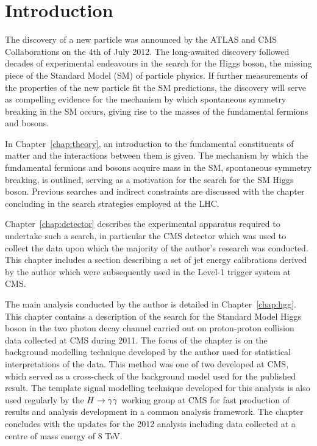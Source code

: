 \chapter{Introduction}
\label{chap:introduction}

The discovery of a new particle was announced by the ATLAS and CMS
Collaborations on the 4th of July 2012. The long-awaited discovery 
followed decades of experimental endeavours in the search for the
Higgs boson, the missing piece of the Standard Model (SM) of particle physics.
If further measurements of the properties of the new particle fit the SM predictions, 
the discovery will serve as compelling evidence for the mechanism by which
spontaneous symmetry breaking in the SM occurs, giving rise
to the masses of the fundamental fermions and bosons. 

In Chapter~\ref{chap:theory}, an introduction to the fundamental constituents of
matter and the interactions between them is given. The mechanism by which 
the fundamental fermions and bosons acquire mass in the SM, spontaneous symmetry breaking,
is outlined, serving as a motivation for the search for the SM Higgs boson. 
Previous searches and indirect constraints are discussed with the chapter concluding in
the search strategies employed at the LHC.

Chapter~\ref{chap:detector} describes the experimental apparatus required to undertake 
such a search, in particular the CMS detector which was used to collect the data upon which 
the majority of the author's research was conducted. This chapter includes a section describing 
a set of jet energy calibrations derived by the author which were subsequently used  
in the Level-1 trigger system at CMS.

The main analysis conducted by the author is detailed in Chapter~\ref{chap:hgg}. This chapter 
contains a description of the search for the Standard Model Higgs boson in the two
photon decay channel carried out on proton-proton collision data collected at CMS during 2011.
The focus of the chapter is on the background modelling technique developed by the author
used for statistical interpretations of the data. This method was one of two developed at CMS, 
which served as a cross-check of the background model used for the published result. 
The template signal modelling technique developed for this analysis is also used regularly by the $H\rightarrow\gamma\gamma$
working group at CMS for fast production of results and analysis development in a common analysis framework.
The chapter concludes with the updates for the 2012 analysis including data
collected at a centre of mass energy of 8 TeV. 

